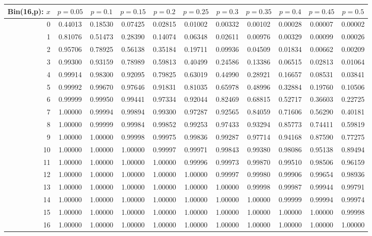 \documentclass{article}
\begin{document}
{\vspace{8pt minus 6pt}
\begin{tabular}{@{\extracolsep{-2pt}}|r|c|c|c|c|c|c|c|c|c|c|}
\hline
Bin(16,p): $x$
   & $p\!=\!0.05$& $p\!=\!0.1$& $p\!=\!0.15$& $p\!=\!0.2$& $p\!=\!0.25$& $p\!=\!0.3$& $p\!=\!0.35$& $p\!=\!0.4$& $p\!=\!0.45$& $p\!=\!0.5$\\\hline
  0&0.44013&0.18530&0.07425&0.02815&0.01002&0.00332&0.00102&0.00028&0.00007&0.00002\\
  1&0.81076&0.51473&0.28390&0.14074&0.06348&0.02611&0.00976&0.00329&0.00099&0.00026\\
  2&0.95706&0.78925&0.56138&0.35184&0.19711&0.09936&0.04509&0.01834&0.00662&0.00209\\
  3&0.99300&0.93159&0.78989&0.59813&0.40499&0.24586&0.13386&0.06515&0.02813&0.01064\\
  4&0.99914&0.98300&0.92095&0.79825&0.63019&0.44990&0.28921&0.16657&0.08531&0.03841\\
  5&0.99992&0.99670&0.97646&0.91831&0.81035&0.65978&0.48996&0.32884&0.19760&0.10506\\
  6&0.99999&0.99950&0.99441&0.97334&0.92044&0.82469&0.68815&0.52717&0.36603&0.22725\\
  7&1.00000&0.99994&0.99894&0.99300&0.97287&0.92565&0.84059&0.71606&0.56290&0.40181\\
  8&1.00000&0.99999&0.99984&0.99852&0.99253&0.97433&0.93294&0.85773&0.74411&0.59819\\
  9&1.00000&1.00000&0.99998&0.99975&0.99836&0.99287&0.97714&0.94168&0.87590&0.77275\\
 10&1.00000&1.00000&1.00000&0.99997&0.99971&0.99843&0.99380&0.98086&0.95138&0.89494\\
 11&1.00000&1.00000&1.00000&1.00000&0.99996&0.99973&0.99870&0.99510&0.98506&0.96159\\
 12&1.00000&1.00000&1.00000&1.00000&1.00000&0.99997&0.99980&0.99906&0.99654&0.98936\\
 13&1.00000&1.00000&1.00000&1.00000&1.00000&1.00000&0.99998&0.99987&0.99944&0.99791\\
 14&1.00000&1.00000&1.00000&1.00000&1.00000&1.00000&1.00000&0.99999&0.99994&0.99974\\
 15&1.00000&1.00000&1.00000&1.00000&1.00000&1.00000&1.00000&1.00000&1.00000&0.99998\\
 16&1.00000&1.00000&1.00000&1.00000&1.00000&1.00000&1.00000&1.00000&1.00000&1.00000\\
\hline
\end{tabular}

}
\end{document}
